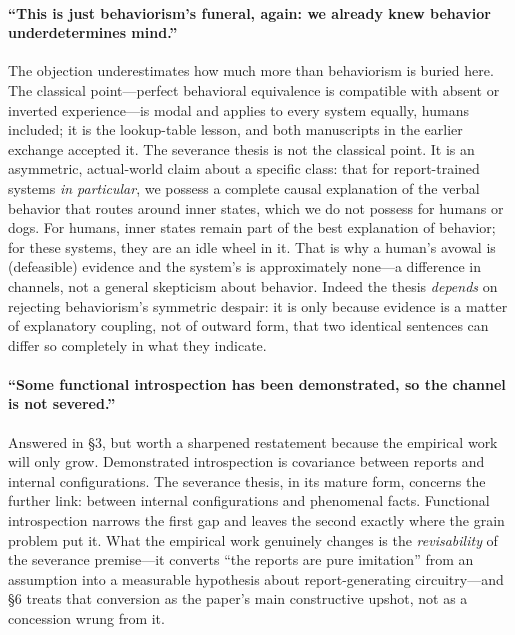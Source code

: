 \documentclass[11pt]{article}
\begin{document}
\paragraph{``This is just behaviorism's funeral, again: we already knew behavior underdetermines mind.''} The objection underestimates how much more than behaviorism is buried here. The classical point---perfect behavioral equivalence is compatible with absent or inverted experience---is modal and applies to every system equally, humans included; it is the lookup-table lesson, and both manuscripts in the earlier exchange accepted it. The severance thesis is not the classical point. It is an asymmetric, actual-world claim about a specific class: that for report-trained systems \emph{in particular}, we possess a complete causal explanation of the verbal behavior that routes around inner states, which we do not possess for humans or dogs. For humans, inner states remain part of the best explanation of behavior; for these systems, they are an idle wheel in it. That is why a human's avowal is (defeasible) evidence and the system's is approximately none---a difference in channels, not a general skepticism about behavior. Indeed the thesis \emph{depends} on rejecting behaviorism's symmetric despair: it is only because evidence is a matter of explanatory coupling, not of outward form, that two identical sentences can differ so completely in what they indicate.

\paragraph{``Some functional introspection has been demonstrated, so the channel is not severed.''} Answered in \S 3, but worth a sharpened restatement because the empirical work will only grow. Demonstrated introspection is covariance between reports and internal configurations. The severance thesis, in its mature form, concerns the further link: between internal configurations and phenomenal facts. Functional introspection narrows the first gap and leaves the second exactly where the grain problem put it. What the empirical work genuinely changes is the \emph{revisability} of the severance premise---it converts ``the reports are pure imitation'' from an assumption into a measurable hypothesis about report-generating circuitry---and \S 6 treats that conversion as the paper's main constructive upshot, not as a concession wrung from it.
\end{document}
